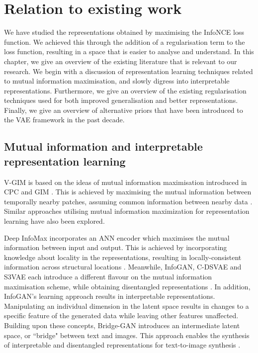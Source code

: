 
\chapter{Relation to existing work}

We have studied the representations obtained by maximising the InfoNCE loss function. We achieved this through the addition of a regularisation term to the loss function, resulting in a space that is easier to analyse and understand. In this chapter, we give an overview of the existing literature that is relevant to our research. We begin with a discussion of representation learning techniques related to mutual information maximisation, and slowly digress into interpretable representations. Furthermore, we give an overview of the existing regularisation techniques used for both improved generalisation and better representations. Finally, we give an overview of alternative priors that have been introduced to the VAE framework in the past decade.


\section{Mutual information and interpretable representation learning}
	V-GIM is based on the ideas of mutual information maximisation introduced in CPC and GIM \cite{lowePuttingEndEndtoEnd2020, oordRepresentationLearningContrastive2019}. This is achieved by maximising the mutual information between temporally nearby patches, assuming common information between nearby data \cite{lowePuttingEndEndtoEnd2020}. Similar approaches utilising mutual information maximization for representation learning have also been explored.
	
	Deep InfoMax incorporates an ANN encoder which maximises the mutual information between input and output. This is achieved by incorporating knowledge about locality in the representations, resulting in locally-consistent information across structural locations \cite{hjelmLearningDeepRepresentations2019}. Meanwhile, InfoGAN, C-DSVAE and S3VAE each introduce a different flavour on the mutual information maximisation scheme, while obtaining disentangled representations \cite{chenInfoGANInterpretableRepresentation2016, baiContrastivelyDisentangledSequential2021, zhuS3VAESelfSupervisedSequential2020}. In addition, InfoGAN's learning approach results in interpretable representations. Manipulating an individual dimension in the latent space results in changes to a specific feature of the generated data while leaving other features unaffected. Building upon these concepts, Bridge-GAN introduces an intermediate latent space, or ``bridge" between text and images. This approach enables the synthesis of interpretable and disentangled representations for text-to-image synthesis \cite{yuanBridgeGANInterpretableRepresentation2020}.
	
